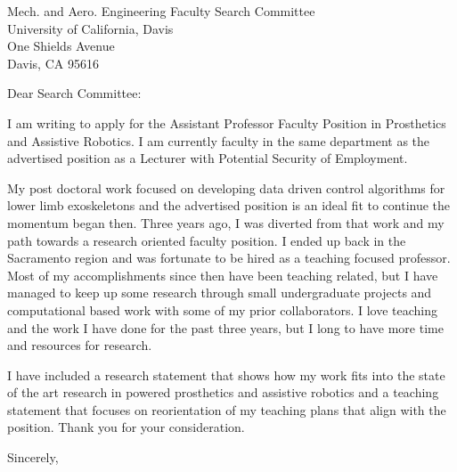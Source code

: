 \documentclass{letter}
\date{September 17, 2018}
\begin{document}
\begin{letter}{
    Mech. and Aero. Engineering Faculty Search Committee \\
    University of California, Davis \\
    One Shields Avenue \\
  Davis, CA 95616}
\opening{Dear Search Committee:}

I am writing to apply for the Assistant Professor Faculty Position in
Prosthetics and Assistive Robotics. I am currently faculty in the same
department as the advertised position as a Lecturer with Potential Security of
Employment.

My post doctoral work focused on developing data driven control algorithms for
lower limb exoskeletons and the advertised position is an ideal fit to continue
the momentum began then. Three years ago, I was diverted from that work and my
path towards a research oriented faculty position. I ended up back in the
Sacramento region and was fortunate to be hired as a teaching focused
professor. Most of my accomplishments since then have been teaching related,
but I have managed to keep up some research through small undergraduate
projects and computational based work with some of my prior collaborators. I
love teaching and the work I have done for the past three years, but I long to
have more time and resources for research.

I have included a research statement that shows how my work fits into the state
of the art research in powered prosthetics and assistive robotics and a
teaching statement that focuses on reorientation of my teaching plans that
align with the position. Thank you for your consideration.

\closing{Sincerely,}

\end{letter}
\end{document}
